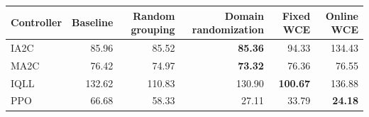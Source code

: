 \begin{tabular}{lrrrrr}
\hline
Controller & Baseline & Random grouping & Domain randomization & Fixed WCE & Online WCE \\
\hline
IA2C & 85.96 & 85.52 & \textbf{85.36} & 94.33 & 134.43 \\
MA2C & 76.42 & 74.97 & \textbf{73.32} & 76.36 & 76.55 \\
IQLL & 132.62 & 110.83 & 130.90 & \textbf{100.67} & 136.88 \\
PPO & 66.68 & 58.33 & 27.11 & 33.79 & \textbf{24.18} \\
\hline
\end{tabular}
